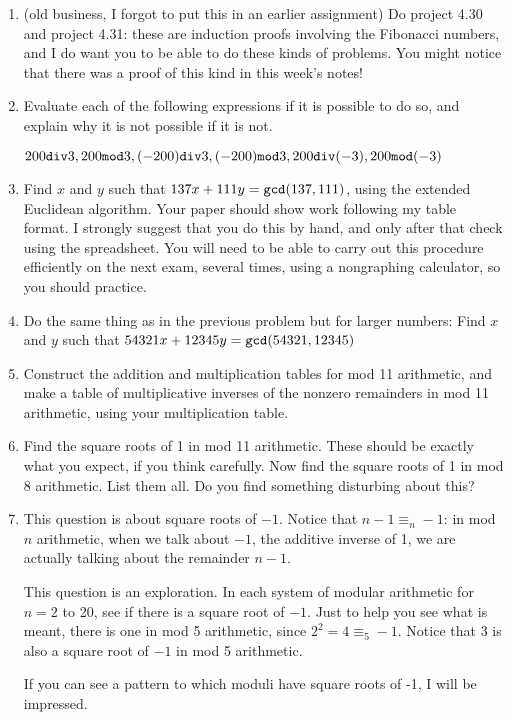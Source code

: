 \documentclass[12pt]{article}
\begin{document}
\begin{enumerate}

\item (old business, I forgot to put this in an earlier assignment)   Do project 4.30 and project 4.31:  these are induction proofs involving the Fibonacci numbers, and I do want you to be able to do these kinds of problems.  You might notice that there was a proof of this kind in this week's notes!

\item  Evaluate each of the following expressions if it is possible to do so, and explain why it is not possible if it is not.

$200{\tt div}3, 200 {\tt mod}3,  (-200){\tt div}3,  (-200) {\tt mod}3,  200{\tt div}(-3),  200 {\tt mod}(-3)$

\item  Find $x$ and $y$ such that $137x + 111y = {\tt gcd}(137,111)$, using the extended Euclidean algorithm.  Your paper should show work following my table format.  I strongly suggest that you do this by hand, and only after that check using the spreadsheet.  You will need to be able to carry out this procedure efficiently on the next exam, several times, using a nongraphing calculator, so you should practice.

\item Do the same thing as in the previous problem but for larger numbers:  Find $x$ and $y$ such that $54321x + 12345y = {\tt gcd}(54321,12345)$

\item  Construct the addition and multiplication tables for mod 11 arithmetic, and make a table of multiplicative inverses of the nonzero remainders in mod 11 arithmetic, using your multiplication table.

\item  Find the square roots of 1 in mod 11 arithmetic.  These should be exactly what you expect, if you think carefully.  Now find the square roots of 1 in mod 8 arithmetic.  List them all.  Do you find something disturbing about this?

\item  This question is about square roots of $-1$.  Notice that $n-1 \equiv_n -1$:  in mod $n$ arithmetic, when we talk about $-1$, the additive inverse of 1,  we are actually talking about the remainder $n-1$.

This question is an exploration.  In each system of modular arithmetic for $n=2$ to 20, see if there is a square root of $-1$.  Just to help you see what is meant, there is one in mod 5 arithmetic, since $2^2 = 4 \equiv_5 -1$.  Notice that 3 is also a square root of $-1$ in mod 5 arithmetic.

If you can see a pattern to which moduli have square roots of -1, I will be impressed.

\end{enumerate}
\end{document}
